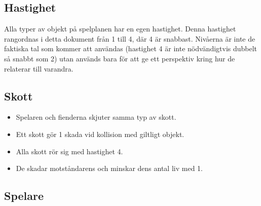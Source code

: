 \documentclass{TDP005mall}
\begin{document}
\subsection{Hastighet}
Alla typer av objekt på spelplanen har en egen hastighet. Denna hastighet rangordnas i detta dokument från 1 till 4, där 4 är snabbast.
Nivåerna är inte de faktiska tal som kommer att användas (hastighet 4 är inte nödvändigtvis dubbelt så snabbt som 2) 
utan används bara för att ge ett perspektiv kring hur de relaterar till varandra.

\subsection{Skott}
\begin{itemize}
\item Spelaren och fienderna skjuter samma typ av skott.
\item Ett skott gör 1 skada vid kollision med giltligt objekt.
\item Alla skott rör sig med hastighet 4.
\item De skadar motståndarens och minskar dens antal liv med 1.
\end{itemize}

\subsection{Spelare}
\end{document}
